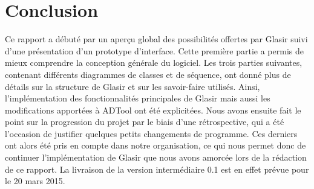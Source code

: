 \section{Conclusion}
    \label{sec:conclusion}

    Ce rapport a débuté par un aperçu global des possibilités offertes par Glasir suivi d'une présentation d'un prototype d'interface. Cette première partie a permis de mieux comprendre la conception générale du logiciel. Les trois parties suivantes, contenant différents diagrammes de classes et de séquence, ont donné plus de détails sur la structure de Glasir et sur les savoir-faire utilisés. Ainsi, l'implémentation des fonctionnalités principales de Glasir mais aussi les modifications apportées à ADTool ont été explicitées. Nous avons ensuite fait le point sur la progression du projet par le biais d'une rétrospective, qui a été l'occasion de justifier quelques petits changements de programme. Ces derniers ont alors été pris en compte dans notre organisation, ce qui nous permet donc de continuer l'implémentation de Glasir que nous avons amorcée lors de la rédaction de ce rapport. La livraison de la version intermédiaire 0.1 est en effet prévue pour le 20 mars 2015.